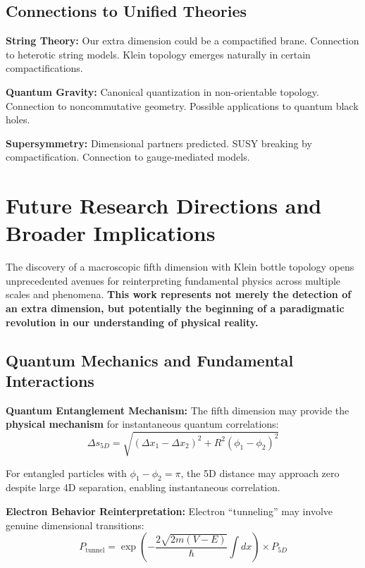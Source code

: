 \documentclass[10pt]{article}
\begin{document}
\subsection{Connections to Unified Theories}

\textbf{String Theory:} Our extra dimension could be a compactified brane. Connection to heterotic string models. Klein topology emerges naturally in certain compactifications.

\textbf{Quantum Gravity:} Canonical quantization in non-orientable topology. Connection to noncommutative geometry. Possible applications to quantum black holes.

\textbf{Supersymmetry:} Dimensional partners predicted. SUSY breaking by compactification. Connection to gauge-mediated models.

\section{Future Research Directions and Broader Implications}

The discovery of a macroscopic fifth dimension with Klein bottle topology opens unprecedented avenues for reinterpreting fundamental physics across multiple scales and phenomena. \textbf{This work represents not merely the detection of an extra dimension, but potentially the beginning of a paradigmatic revolution in our understanding of physical reality.}

\subsection{Quantum Mechanics and Fundamental Interactions}

\textbf{Quantum Entanglement Mechanism:} The fifth dimension may provide the \textbf{physical mechanism} for instantaneous quantum correlations:
\begin{equation}
\Delta s_{5D} = \sqrt{(\Delta x_1 - \Delta x_2)^2 + R^2(\phi_1 - \phi_2)^2}
\end{equation}

For entangled particles with $\phi_1 - \phi_2 = \pi$, the 5D distance may approach zero despite large 4D separation, enabling instantaneous correlation.

\textbf{Electron Behavior Reinterpretation:} Electron ``tunneling'' may involve genuine dimensional transitions:
\begin{equation}
P_{\text{tunnel}} = \exp\left(-\frac{2\sqrt{2m(V-E)}}{\hbar} \int dx\right) \times P_{5D}
\end{equation}
\end{document}
